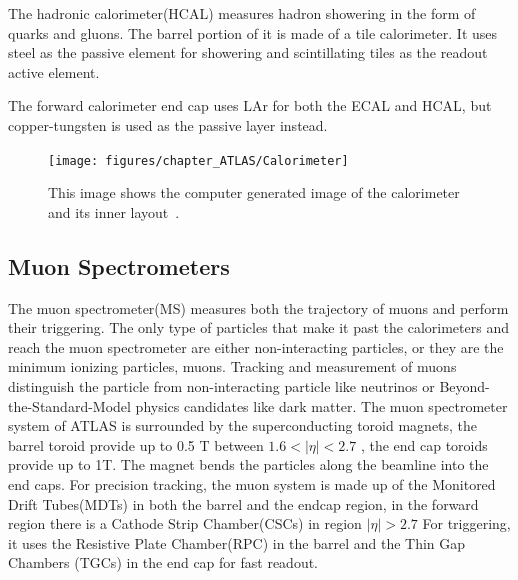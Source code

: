 The hadronic calorimeter(HCAL) measures hadron showering in the form of quarks and gluons. The barrel portion of it is made of a tile calorimeter. It uses steel as the passive element for showering and scintillating tiles as the readout active element. 

The forward calorimeter end cap uses LAr for both the ECAL and HCAL, but copper-tungsten is used as the passive layer instead. 


\begin{figure}[!htb]
    \begin{center}
        \texttt{[image: figures/chapter\_ATLAS/Calorimeter]}
        \caption{
            This image shows the computer generated image of the calorimeter and its inner layout~\cite{Pequenao:1095927}.
        }
        \label{fig:Calorimeter}
    \end{center}
\end{figure}

\subsection{Muon Spectrometers}
The muon spectrometer(MS) measures both the trajectory of muons and perform their triggering. The only type of particles that make it past the calorimeters and reach the muon spectrometer are either non-interacting particles, or they are the minimum ionizing particles, muons. Tracking and measurement of muons distinguish the particle from non-interacting particle like neutrinos or Beyond-the-Standard-Model physics candidates like dark matter. 
The muon spectrometer system of ATLAS is surrounded by the superconducting toroid magnets, the barrel toroid provide up to 0.5 T between $1.6 < |\eta|<2.7$ , the end cap toroids provide up to 1T. The magnet bends the particles along the beamline into the end caps.
For precision tracking, the muon system is made up of the Monitored Drift Tubes(MDTs) in both the barrel and the endcap region, in the forward region there is a Cathode Strip Chamber(CSCs) in region $|\eta|>2.7$
For triggering, it uses the Resistive Plate Chamber(RPC) in the barrel and the Thin Gap Chambers (TGCs) in the end cap for fast readout. 


